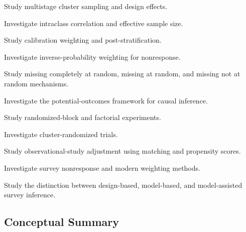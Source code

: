 \begin{exercise}[4]
Study multistage cluster sampling and design effects.
\end{exercise}

\begin{exercise}[4]
Investigate intraclass correlation and effective sample size.
\end{exercise}

\begin{exercise}[4]
Study calibration weighting and post-stratification.
\end{exercise}

\begin{exercise}[4]
Investigate inverse-probability weighting for nonresponse.
\end{exercise}

\begin{exercise}[4]
Study missing completely at random, missing at random, and missing not at
random mechanisms.
\end{exercise}

\begin{exercise}[4]
Investigate the potential-outcomes framework for causal inference.
\end{exercise}

\begin{exercise}[4]
Study randomized-block and factorial experiments.
\end{exercise}

\begin{exercise}[4]
Investigate cluster-randomized trials.
\end{exercise}

\begin{exercise}[4]
Study observational-study adjustment using matching and propensity
scores.
\end{exercise}

\begin{exercise}[4]
Investigate survey nonresponse and modern weighting methods.
\end{exercise}

\begin{exercise}[4]
Study the distinction between design-based, model-based, and
model-assisted survey inference.
\end{exercise}

\subsection{Conceptual Summary}
\label{subsec:data-collection-summary}

